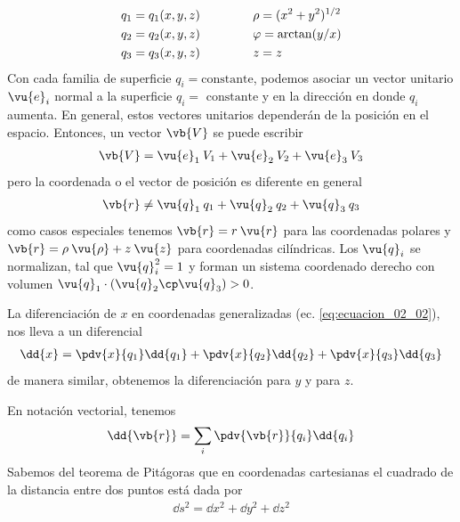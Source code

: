 \begin{align}
\begin{aligned}
q_{1} = q_{1}(x,y,z) & \hspace{1.5cm} \rho = (x^{2} + y^{2})^{1/2} \\
q_{2} = q_{2}(x,y,z) & \hspace{1.5cm} \varphi = \arctan(y/x) \\
q_{3} = q_{3}(x,y,z) & \hspace{1.5cm} z = z
\end{aligned}
\label{eq:ecuacion_02_02}
\end{align}
Con cada familia de superficie $q_{i} = \mbox {constante}$, podemos asociar un vector unitario $\vu{e}_{i}$ normal a la superficie $q_{i} = \mbox{ constante}$ y en la dirección en donde $q_{i}$ aumenta. En general, estos vectores unitarios dependerán de la posición en el espacio. Entonces,  un vector $\vb{V}$ se puede escribir
\begin{align}
\vb{V} = \vu{e}_{1} \: V_{1} +\vu{e}_{2} \: V_{2} + \vu{e}_{3} \: V_{3}
\label{eq:ecuacion_02_03}
\end{align}
pero la coordenada o el vector de posición es diferente en general
\begin{align*}
\vb{r} \neq \vu{q}_{1} \: q_{1} + \vu{q}_{2} \: q_{2} + \vu{q}_{3} \: q_{3}
\end{align*}
como casos especiales tenemos $\vb{r} = r \: \vu{r}$ para las coordenadas polares y $\vb{r} = \rho \: \vu{\rho} + z \: \vu{z}$ para coordenadas cilíndricas. Los $\vu{q}_{i}$ se normalizan, tal que $\vu{q}_{i}^{2} = 1$ y forman un sistema coordenado derecho con volumen $\vu{q}_{1} \cdot (\vu{q}_{2} \cp \vu{q}_{3} ) > 0$.
\par
La diferenciación de $x$ en coordenadas generalizadas (ec. \ref{eq:ecuacion_02_02}), nos lleva a un diferencial
\begin{align}
\dd{x} = \pdv{x}{q_{1}} \dd{q_{1}} + \pdv{x}{q_{2}} \dd{q_{2}} + \pdv{x}{q_{3}} \dd{q_{3}}
\label{eq:ecuacion_02_04}
\end{align}
de manera similar, obtenemos la diferenciación para $y$ y para $z$.
\par
En notación vectorial, tenemos
\begin{align*}
\dd{\vb{r}} = \sum_{i} \pdv{\vb{r}}{q_{i}} \dd{q_{i}}
\end{align*}
Sabemos del teorema de Pitágoras que en coordenadas cartesianas el cuadrado de la distancia entre dos puntos está dada por
\begin{align*}
\dd{s^{2}} = \dd{x^{2}} + \dd{y^{2}} + \dd{z^{2}}
\end{align*}
